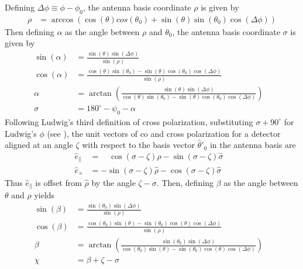 \documentclass[a4paper,11pt]{article}
\newcommand{\co}{\mathbin{\|}}
\newcommand{\cx}{\mathbin{\times}}
\begin{document}
Defining $\Delta \phi \equiv \phi - \phi_0$, the antenna basis coordinate $\rho$ is given by
%
\begin{align}
\rho  &= \arccos( \cos(\theta) cos(\theta_0) + \sin(\theta) \sin(\theta_0) \cos(\Delta \phi) )
\end{align}
%
Then defining $\alpha$ as the angle between $\rho$ and $\theta_0$, the antenna basis coordinate $\sigma$ is given by
%
\begin{align}
\sin(\alpha) &= \frac{\sin(\theta) \sin(\Delta \phi)}{\sin(\rho)} & \\
\cos(\alpha) &= \frac{\cos(\theta) \sin(\theta_0) - \sin(\theta) \cos(\theta_0) \cos(\Delta \phi)}{\sin(\rho)} & \\ 
\alpha       &=  \arctan \left(\frac{\sin(\theta) \sin(\Delta \phi)}{\cos(\theta) \sin(\theta_0) - \sin(\theta) \cos(\theta_0) \cos(\Delta \phi)} \right)  & \\
\sigma &= 180^{\circ} - \psi_0 - \alpha &
\end{align}
%
Following Ludwig's third definition of cross polarization, substituting $\sigma + 90^{\circ}$ for Ludwig's $\phi$ (see \cite{1140406}), the unit vectors of co and cross polarization for a detector aligned at an angle $\zeta$ with respect to the basis vector $\hat{\theta}'_0$ in the antenna basis are
%
\begin{align}
\hat{e}_{\co} &=  \quad \cos(\sigma - \zeta) \hat{\rho} - \sin(\sigma - \zeta) \hat{\sigma} & \\
\hat{e}_{\cx} &=      - \sin(\sigma - \zeta) \hat{\rho} - \cos(\sigma - \zeta) \hat{\sigma} & 
\end{align}
%
Thus $\hat{e}_{\co}$ is offset from $\hat{\rho}$ by the angle $\zeta - \sigma$. Then, defining $\beta$ as the angle between $\theta$ and $\rho$ yields
%
\begin{align}
\sin(\beta) &= \frac{\sin(\theta_0) \sin(\Delta \phi)}{\sin(\rho)} & \\
\cos(\beta) &= \frac{\cos(\theta_0) \sin(\theta) - \sin(\theta_0) \cos(\theta) \cos(\Delta \phi)}{\sin(\rho)} & \\ 
\beta       &=  \arctan \left(\frac{\sin(\theta_0) \sin(\Delta \phi)}{\cos(\theta_0) \sin(\theta) - \sin(\theta_0) \cos(\theta) \cos(\Delta \phi)} \right)  & \\
\chi &= \beta + \zeta - \sigma &
\end{align}
\end{document}
